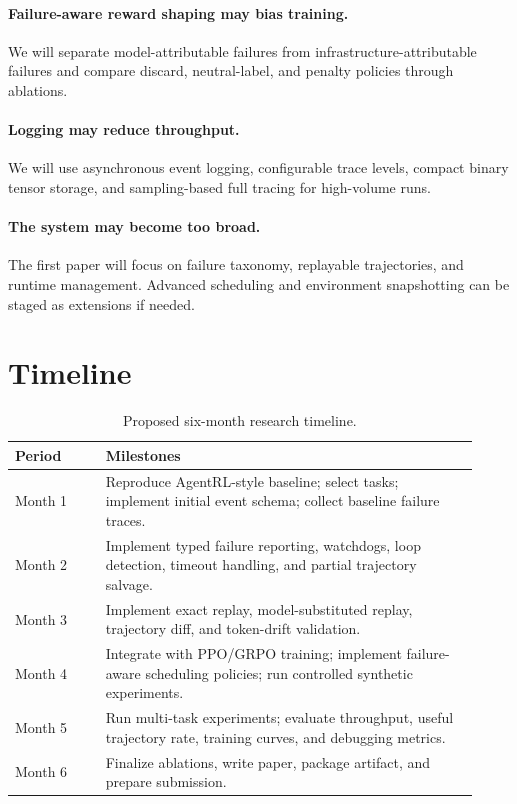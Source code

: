 \documentclass[11pt]{article}
\begin{document}
\paragraph{Failure-aware reward shaping may bias training.}
We will separate model-attributable failures from infrastructure-attributable failures and compare discard, neutral-label, and penalty policies through ablations.

\paragraph{Logging may reduce throughput.}
We will use asynchronous event logging, configurable trace levels, compact binary tensor storage, and sampling-based full tracing for high-volume runs.

\paragraph{The system may become too broad.}
The first paper will focus on failure taxonomy, replayable trajectories, and runtime management.
Advanced scheduling and environment snapshotting can be staged as extensions if needed.

\section{Timeline}

\begin{table}[h]
\centering
\small
\begin{tabular}{p{0.18\linewidth}p{0.74\linewidth}}
\toprule
\textbf{Period} & \textbf{Milestones} \\
\midrule
Month 1 & Reproduce AgentRL-style baseline; select tasks; implement initial event schema; collect baseline failure traces. \\
Month 2 & Implement typed failure reporting, watchdogs, loop detection, timeout handling, and partial trajectory salvage. \\
Month 3 & Implement exact replay, model-substituted replay, trajectory diff, and token-drift validation. \\
Month 4 & Integrate with PPO/GRPO training; implement failure-aware scheduling policies; run controlled synthetic experiments. \\
Month 5 & Run multi-task experiments; evaluate throughput, useful trajectory rate, training curves, and debugging metrics. \\
Month 6 & Finalize ablations, write paper, package artifact, and prepare submission. \\
\bottomrule
\end{tabular}
\caption{Proposed six-month research timeline.}
\end{table}
\end{document}

